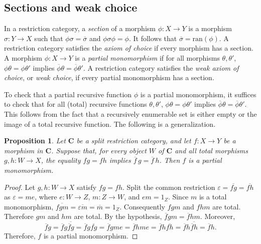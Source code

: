 \documentclass[letterpaper,10pt]{amsart}
\theoremstyle{plain}
\newtheorem{prop}{Proposition}[thm]
\theoremstyle{definition}
\newcommand{\MAP}[3]{{#1}:{#2}\rightarrow{#3}}
\newcommand{\rst}[1]{\overline{#1}}
\begin{document}
\subsection{Sections and weak choice}
In a restriction category, a {\it section} of a morphism
$\MAP{\phi}{X}{Y}$  is a morphism $\MAP{\sigma}{Y}{X}$ such that
$\phi\sigma=\rst\sigma$ and $\phi\sigma\phi=\phi$. It follows that
$\rst{\sigma}=\mathrm{ran}(\phi)$. A
restriction category satisfies the {\it axiom of choice} if every morphism
has a section. A morphism  $\MAP{\phi}{X}{Y}$ is a {\it partial monomorphism}
if for all morphisms $\theta,\theta'$, $\phi\theta=\phi\theta'$ implies $\rst{\phi}\theta=\rst{\phi}\theta'$.
A restriction category satisfies the \textit{weak axiom of choice},
or \textit{weak choice}, if every partial monomorphism has a section.

To check that a partial recursive function $\phi$ is a partial monomorphism, it suffices to check that for all (total) recursive functions $\theta,\theta'$, $\phi\theta=\phi\theta'$ implies $\rst\phi\theta=\rst\phi\theta'$. This follows from the fact that a recursively enumerable set is either empty or the image of a total recursive function. The following is a generalization.

\begin{prop}\label{PropPartialMono}
Let $\mathbf{C}$ be a split restriction category, and let $\MAP{f}{X}{Y}$ be a morphism in $\mathbf{C}$. Suppose that, for every object $W$ of $\mathbf C$ and all total
morphisms $g,h:W\to X$, the equality $fg=fh$ implies
$\rst f\,g=\rst f\,h$. 
Then $f$ is a partial monomorphism.
\end{prop}

\begin{proof}
Let $g,h:W\to X$ satisfy $fg=fh$. Split the common restriction
$\varepsilon=\rst{fg}=\rst{fh}$ as $\varepsilon=me$, where
$e:W\to Z$, $m:Z\to W$, and $em=1_Z$. Since $m$ is a total monomorphism,
$\rst{fgm}=\rst{\varepsilon m}=\rst m=1_Z$.
Consequently $fgm$ and $fhm$ are total. 
Therefore
$g m$ and $h m$ are total. By the hypothesis, $\rst{f}g m = \rst{f}h m$. Moreover,
\[
\rst{f}g = \rst{f}g\rst{\rst{f}g} = \rst{f}g\rst{fg}
         = \rst{f}gme =\rst{f}hme =\rst{f}h\rst{fh}
         =\rst{f}h\rst{\rst{f}h} = \rst{f}h.
\]
Therefore, $f$ is a partial monomorphism.
\end{proof}
\end{document}
